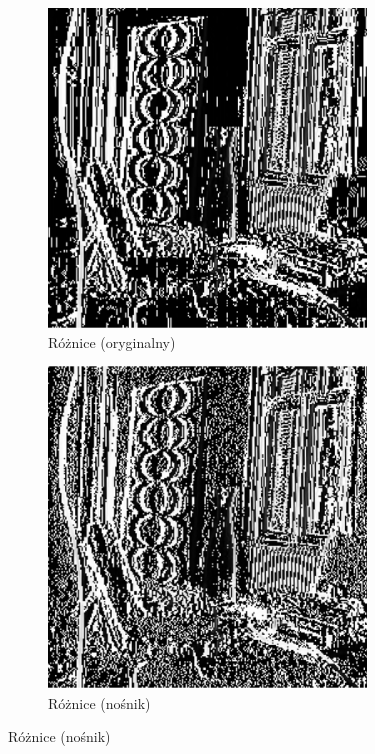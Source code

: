 \begin{figure}[h]
\begin{subfigure}{0.3\textwidth}
                \includegraphics[width=\textwidth]{img/diff_cover.png}
                \caption{Różnice (oryginalny)}
            \end{subfigure}
            \hfill
            \begin{subfigure}{0.3\textwidth}
                \centering
                \includegraphics[width=\textwidth]{img/diff_stego.png}
                \caption{Różnice (nośnik)}
            \end{subfigure}
        

\end{figure}
